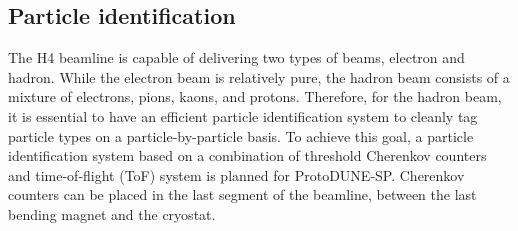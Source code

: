 
\subsection{Particle identification}

The H4 beamline is capable of delivering two types of beams, electron and hadron. %
While the electron beam is relatively pure, the hadron beam consists of a mixture of electrons, pions, kaons, and protons. Therefore, for the hadron beam, it is essential to have an efficient particle identification system to cleanly tag particle types on a particle-by-particle basis. To achieve this goal, a particle identification system based on a combination of threshold Cherenkov counters and time-of-flight (ToF) system is planned for ProtoDUNE-SP. 
Cherenkov counters can be placed in the last segment of the beamline, between the last bending magnet and the cryostat. 

